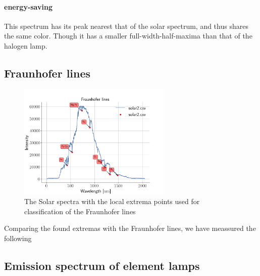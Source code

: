 \paragraph{energy-saving}
This spectrum has its peak nearest that of the solar spectrum, and thus shares
the same color. Though it has a smaller full-width-half-maxima than that of the
halogen lamp.

\subsection{Fraunhofer lines}
\begin{figure}[h]
\centering
\includegraphics[width=0.65\textwidth]{Fraunhofer}
\caption{The Solar spectra with the local extrema points used for
classification of the Fraunhofer lines}
\label{frauenhofer}
\end{figure}

Comparing the found extremas with the Fraunhofer lines, we have meassured the
following

\subsection{Emission spectrum of element lamps}

